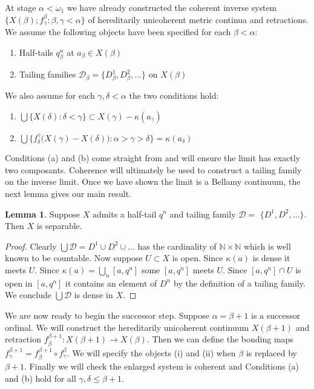 \documentclass[12pt]{article}
\theoremstyle{plain}
\theoremstyle{definition}
\newtheorem{lemma}[theorem]{Lemma}
\newcommand{\A}{\ensuremath{\alpha}}
\newcommand{\K}{\ensuremath{\kappa}}
\newcommand{\B}{\ensuremath{\beta}}
\newcommand{\W}{\ensuremath{\omega}}
\newcommand{\G}{\ensuremath{\gamma}}
\newcommand{\D}{\ensuremath{\delta}}
\newcommand{\NN}{\ensuremath{\mathbb N}}
\newcommand{\0}{\ensuremath{\varnothing}}
\newcommand{\cD}{\ensuremath{\mathcal D}}
\begin{document}
	At stage $\A < \W_1$ we have already constructed the coherent inverse system \mbox{$\{X(\B);f^\B_\G: \B,\G < \A\}$} of hereditarily unicoherent metric continua and retractions. We assume the following objects have been specified for each $\B < \A$:
	
	
	\begin{enumerate}[label=(\roman*)]
		\item Half-tails $q^n_\B$ at $a_\B \in X(\B)$
		
		\item Tailing families $\cD_\B = \{D_\B^1, D_\B^2, \ldots\}$ on $X(\B)$
	\end{enumerate}
	
	We also assume for each $\G,\D < \A$ the two conditions hold:
	
	\begin{enumerate}[label=(\alph*)]
		\item $\bigcup \{X(\D): \D < \G\} \subset X(\G) - \K(a_\G)$ 
		\item $\bigcup \big \{f^\G_\D  \big (X(\G) - X(\D) \big ): \A > \G > \D \big \} = \K(a_\D)$
	\end{enumerate}
	
	
	Conditions (a) and (b) come straight from \cite{one} and will ensure the limit has exactly two composants.
	Coherence will ultimately be used to construct a tailing family on the inverse limit. Once we have shown the limit is a Bellamy continuum, the next lemma gives our main result.
	
	
	\begin{lemma}\label{tailingdense}
		Suppose $X$ admits a half-tail $q^n$ and tailing family $\cD= $ $\{D^1,D^2,\ldots\}$.
		Then $X$ is separable.
	\end{lemma}
	
	\begin{proof}
		Clearly $\bigcup \cD = D^1 \cup D^2 \cup \ldots $ has the cardinality of $\NN \times \NN$ which is well known to be countable.
		Now suppose $U \subset X$ is open.
		Since $\K(a)$ is dense it meets $U$.
		Since $\K(a) = \bigcup _n [a,q^n]$ some $[a,q^n]$ meets $U$.
		Since $[a,q^n] \cap U$ is open in $[a,q^n]$ it  contains an element of $D^n$ by the definition of a tailing family.
		We conclude $\bigcup \cD$ is dense in $X$.
	\end{proof}
	
	\noindent
	
	We are now ready to begin the successor step. Suppose $\A=\B+1$ is a successor ordinal. We will construct the hereditarily unicoherent continuum $X(\B+1)$ and retraction $f^{\B+1}_\B:X(\B+1) \to X(\B)$. Then we can define the bonding maps $f^{\B+1}_\G = f^{\B+1}_\B  \circ f^{\B}_\G $.
	We will specify the objects (i) and (ii) when $\B$ is replaced by $\B+1$. Finally we will check the enlarged system is coherent and Conditions (a) and (b) hold for all $\G,\D \le \B+1$.
	
\end{document}
